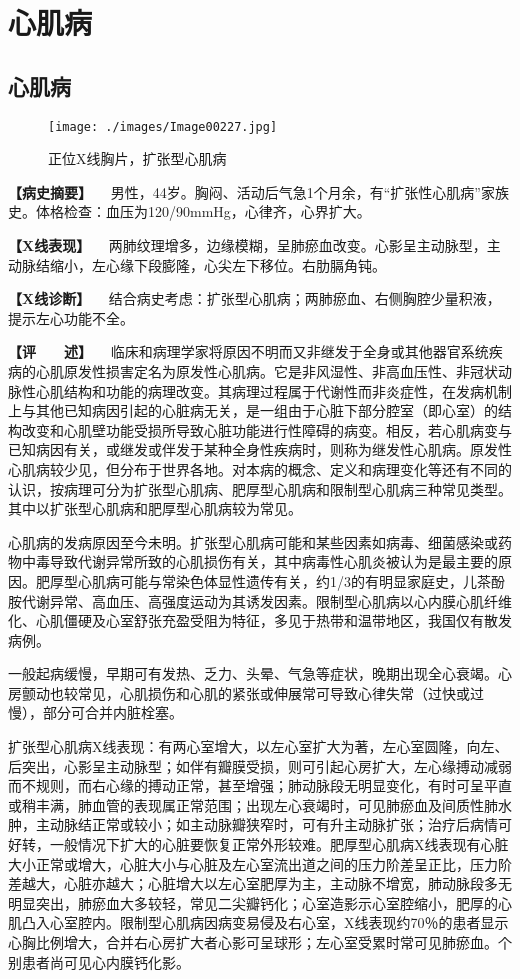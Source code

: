 \section{心肌病}

\subsection{心肌病}

\begin{figure}[!htbp]
 \centering
 \texttt{[image: ./images/Image00227.jpg]}
 \captionsetup{justification=centering}
 \caption{正位X线胸片，扩张型心肌病}
 \label{fig4-7-1}
  \end{figure} 

\textbf{【病史摘要】}
　男性，44岁。胸闷、活动后气急1个月余，有“扩张性心肌病”家族史。体格检查：血压为120/90mmHg，心律齐，心界扩大。

\textbf{【X线表现】}
　两肺纹理增多，边缘模糊，呈肺瘀血改变。心影呈主动脉型，主动脉结缩小，左心缘下段膨隆，心尖左下移位。右肋膈角钝。

\textbf{【X线诊断】}
　结合病史考虑：扩张型心肌病；两肺瘀血、右侧胸腔少量积液，提示左心功能不全。

\textbf{【评　　述】}
　临床和病理学家将原因不明而又非继发于全身或其他器官系统疾病的心肌原发性损害定名为原发性心肌病。它是非风湿性、非高血压性、非冠状动脉性心肌结构和功能的病理改变。其病理过程属于代谢性而非炎症性，在发病机制上与其他已知病因引起的心脏病无关，是一组由于心脏下部分腔室（即心室）的结构改变和心肌壁功能受损所导致心脏功能进行性障碍的病变。相反，若心肌病变与已知病因有关，或继发或伴发于某种全身性疾病时，则称为继发性心肌病。原发性心肌病较少见，但分布于世界各地。对本病的概念、定义和病理变化等还有不同的认识，按病理可分为扩张型心肌病、肥厚型心肌病和限制型心肌病三种常见类型。其中以扩张型心肌病和肥厚型心肌病较为常见。

心肌病的发病原因至今未明。扩张型心肌病可能和某些因素如病毒、细菌感染或药物中毒导致代谢异常所致的心肌损伤有关，其中病毒性心肌炎被认为是最主要的原因。肥厚型心肌病可能与常染色体显性遗传有关，约1/3的有明显家庭史，儿茶酚胺代谢异常、高血压、高强度运动为其诱发因素。限制型心肌病以心内膜心肌纤维化、心肌僵硬及心室舒张充盈受阻为特征，多见于热带和温带地区，我国仅有散发病例。

一般起病缓慢，早期可有发热、乏力、头晕、气急等症状，晚期出现全心衰竭。心房颤动也较常见，心肌损伤和心肌的紧张或伸展常可导致心律失常（过快或过慢），部分可合并内脏栓塞。

扩张型心肌病X线表现：有两心室增大，以左心室扩大为著，左心室圆隆，向左、后突出，心影呈主动脉型；如伴有瓣膜受损，则可引起心房扩大，左心缘搏动减弱而不规则，而右心缘的搏动正常，甚至增强；肺动脉段无明显变化，有时可呈平直或稍丰满，肺血管的表现属正常范围；出现左心衰竭时，可见肺瘀血及间质性肺水肿，主动脉结正常或较小；如主动脉瓣狭窄时，可有升主动脉扩张；治疗后病情可好转，一般情况下扩大的心脏要恢复正常外形较难。肥厚型心肌病X线表现有心脏大小正常或增大，心脏大小与心脏及左心室流出道之间的压力阶差呈正比，压力阶差越大，心脏亦越大；心脏增大以左心室肥厚为主，主动脉不增宽，肺动脉段多无明显突出，肺瘀血大多较轻，常见二尖瓣钙化；心室造影示心室腔缩小，肥厚的心肌凸入心室腔内。限制型心肌病因病变易侵及右心室，X线表现约70％的患者显示心胸比例增大，合并右心房扩大者心影可呈球形；左心室受累时常可见肺瘀血。个别患者尚可见心内膜钙化影。

